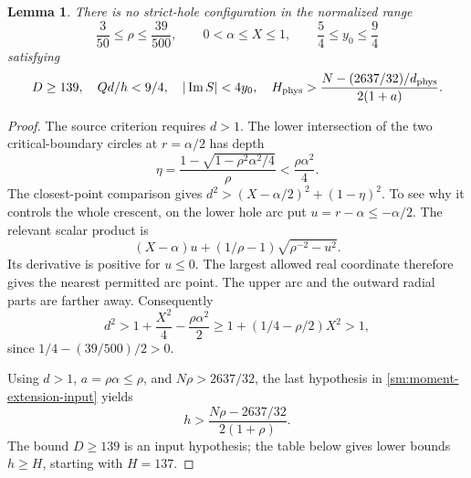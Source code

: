 \documentclass[11pt,reqno]{amsart}
\numberwithin{equation}{section}
\newtheorem{lemma}[theorem]{Lemma}
\theoremstyle{definition}
\theoremstyle{remark}
\renewcommand{\Im}{\operatorname{Im}}
\begin{document}
\begin{lemma}\label{sm:T-moment-extension}
There is no strict-hole configuration in the normalized
range
\[
 \frac3{50}\le\rho\le\frac{39}{500},\qquad
 0<\alpha\le X\le1,\qquad \frac54\le y_0\le\frac94
\]
satisfying
\begin{equation}\label{sm:moment-extension-input}
 D\ge139,\quad Qd/h<9/4,\quad |\Im S|<4y_0,\quad
 H_{\rm phys}>
 \frac{N-(2637/32)/d_{\rm phys}}{2(1+a)}.
\end{equation}
\end{lemma}
\begin{proof}
The source criterion requires $d>1$. The lower intersection of the two
critical-boundary circles at $r=\alpha/2$ has depth
\[
 \eta=\frac{1-\sqrt{1-\rho^2\alpha^2/4}}{\rho}
      <\frac{\rho\alpha^2}{4}.
\]
The closest-point comparison gives
$d^2>(X-\alpha/2)^2+(1-\eta)^2$.
To see why it controls the whole crescent, on the lower hole arc put
$u=r-\alpha\le-\alpha/2$. The relevant scalar product is
\[
 (X-\alpha)u+(1/\rho-1)\sqrt{\rho^{-2}-u^2}.
\]
Its derivative is positive for $u\le0$. The largest allowed real
coordinate therefore gives the nearest permitted arc point.
The upper arc and the outward radial parts are farther away.
Consequently
\[
 d^2>1+\frac{X^2}{4}-\frac{\rho\alpha^2}{2}
 \ge1+(1/4-\rho/2)X^2>1,
\]
since $1/4-(39/500)/2>0$.

Using $d>1$, $a=\rho\alpha\le\rho$, and $N\rho>2637/32$,
the last hypothesis in \eqref{sm:moment-extension-input} yields
\begin{equation}\label{sm:moment-extension-field}
 h>\frac{N\rho-2637/32}{2(1+\rho)}.
\end{equation}
The bound $D\ge139$ is an input hypothesis; the table below gives
lower bounds $h\ge H$, starting with $H=137$.


\end{proof}
\end{document}
